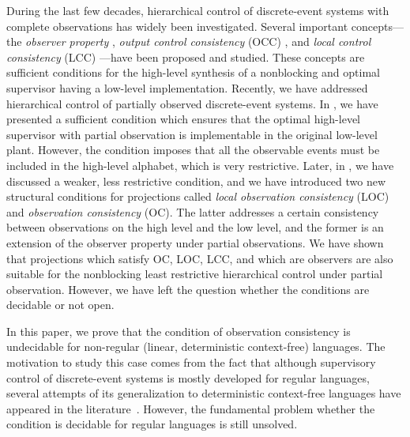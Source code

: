 \documentclass[preprint,1p,times]{elsarticle}
\begin{document}
  During the last few decades, hierarchical control of discrete-event systems with complete observations has widely been investigated. Several important concepts---the {\em observer property\/} \cite{WW96}, {\em output control consistency\/} (OCC) \cite{WZ91}, and {\em local control consistency\/} (LCC) \cite{SB08}---have been proposed and studied. These concepts are sufficient conditions for the high-level synthesis of a nonblocking and optimal supervisor having a low-level implementation. Recently, we have addressed hierarchical control of partially observed discrete-event systems. In \cite{KM10}, we have presented a sufficient condition which ensures that the optimal high-level supervisor with partial observation is implementable in the original low-level plant. However, the condition imposes that all the observable events must be included in the high-level alphabet, which is very restrictive. Later, in \cite{cdc-ecc2011}, we have discussed a weaker, less restrictive condition, and we have introduced two new structural conditions for projections called {\em local observation consistency\/} (LOC) and {\em observation consistency\/} (OC). The latter addresses a certain consistency between observations on the high level and the low level, and the former is an extension of the observer property under partial observations. We have shown that projections which satisfy OC, LOC, LCC, and which are observers are also suitable for the nonblocking least restrictive hierarchical control under partial observation. However, we have left the question whether the conditions are decidable or not open. 
  
  In this paper, we prove that the condition of observation consistency is undecidable for non-regular (linear, deterministic context-free) languages. The motivation to study this case comes from the fact that although supervisory control of discrete-event systems is mostly developed for regular languages, several attempts of its generalization to deterministic context-free languages have appeared in the literature~\cite{gri07,gri10}. However, the fundamental problem whether the condition is decidable for regular languages is still unsolved.
\end{document}
